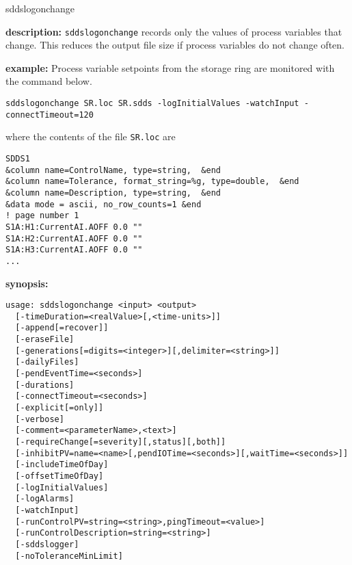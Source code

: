 %
%
\begin{sddsprog}{sddslogonchange}
\item {\bf description:}
%
%
\verb+sddslogonchange+ records only the values of process variables that change. This reduces the output file size if process variables do not change often.
\item {\bf example:} 
%
% 
%
Process variable setpoints from the storage ring are monitored
with the command below.
\begin{verbatim}
sddslogonchange SR.loc SR.sdds -logInitialValues -watchInput -connectTimeout=120
\end{verbatim}
where the contents of the file \verb+SR.loc+ are
\begin{verbatim}
SDDS1
&column name=ControlName, type=string,  &end
&column name=Tolerance, format_string=%g, type=double,  &end
&column name=Description, type=string,  &end
&data mode = ascii, no_row_counts=1 &end
! page number 1
S1A:H1:CurrentAI.AOFF 0.0 ""
S1A:H2:CurrentAI.AOFF 0.0 ""
S1A:H3:CurrentAI.AOFF 0.0 ""
...
\end{verbatim}
\item {\bf synopsis:} 
%
%
\begin{verbatim}
usage: sddslogonchange <input> <output> 
  [-timeDuration=<realValue>[,<time-units>]]
  [-append[=recover]] 
  [-eraseFile]
  [-generations[=digits=<integer>][,delimiter=<string>]]
  [-dailyFiles]
  [-pendEventTime=<seconds>] 
  [-durations] 
  [-connectTimeout=<seconds>]
  [-explicit[=only]] 
  [-verbose] 
  [-comment=<parameterName>,<text>]
  [-requireChange[=severity][,status][,both]]
  [-inhibitPV=name=<name>[,pendIOTime=<seconds>][,waitTime=<seconds>]]
  [-includeTimeOfDay] 
  [-offsetTimeOfDay]
  [-logInitialValues]
  [-logAlarms]
  [-watchInput]
  [-runControlPV=string=<string>,pingTimeout=<value>]
  [-runControlDescription=string=<string>]
  [-sddslogger]
  [-noToleranceMinLimit]


\end{verbatim}
\end{sddsprog}
